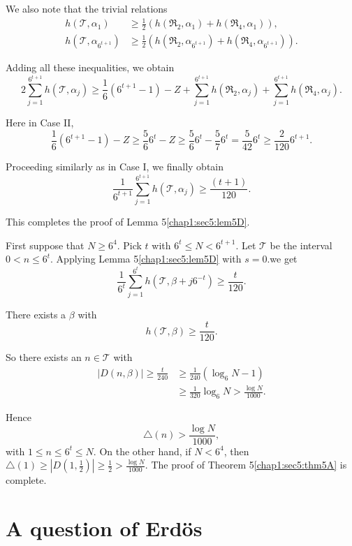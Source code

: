 We also note that the trivial relations
\begin{align*}
h(\mathscr{T}, \alpha_{1}) & \geq \frac{1}{2} (h(\mathfrak{R}_{2}, \alpha_{1}) + h(\mathfrak{R}_{4}, \alpha_{1})),\\
h(\mathscr{T}, \alpha_{6^{t+1}}) & \geq \frac{1}{2} (h(\mathfrak{R}_{2}, \alpha_{6^{t+1}}) + h(\mathfrak{R}_{4}, \alpha_{6^{t+1}})).
\end{align*}

Adding all these inequalities, we obtain
$$
2 \sum_{j=1}^{6^{t+1}} h(\mathscr{T}, \alpha_{j})\geq \frac{1}{6} (6^{t+1} - 1) - Z + \sum_{j=1}^{6^{t+1}} h(\mathfrak{R}_{2}, \alpha_{j}) + \sum_{j=1}^{6^{t+1}} h(\mathfrak{R}_{4}, \alpha_{j}).
$$

Here in Case II, 
$$
\frac{1}{6} (6^{t+1} - 1) - Z \geq \frac{5}{6} 6^{t} - Z \geq \frac{5}{6} 6^{t} - \frac{5}{7} 6^{t} = \frac{5}{42} 6^{t} \geq \frac{2}{120} 6^{t+1}.
$$

Proceeding similarly as in Case I, we finally obtain 
$$
\frac{1}{6^{t+1}} \sum_{j=1}^{6^{t+1}} h(\mathscr{T}, \alpha_{j}) \geq \frac{(t+1)}{120}.
$$

This completes the proof of Lemma 5\ref{chap1:sec5:lem5D}.

 First suppose that $N \geq 6^{4}$. Pick $t$ with $6^{t} \leq N  < 6^{t+1}$. Let $\mathscr{T}$ be the interval $0 < n \leq 6^{t}$. Applying Lemma 5\ref{chap1:sec5:lem5D} with $s = 0$.\pageoriginale we get
$$
\frac{1}{6^{t}} \sum_{j=1}^{6^{t}} h(\mathscr{T}, \beta + j 6^{-t}) \geq \frac{t}{120}.
$$

There exists a $\beta$ with
$$
h(\mathscr{T}, \beta) \geq \frac{t}{120}.
$$

So there exists an $n \in \mathscr{T}$ with
\begin{align*}
|D(n, \beta)| \geq \frac{t}{240} & \geq \frac{1}{240} (\log_{6} N - 1)\\
& \geq \frac{1}{320} \log_{6} N > \frac{\log N}{1000}.
\end{align*}

Hence
$$
\triangle(n) > \frac{\log N}{1000},
$$
with $1 \leq n \leq 6^{t} \leq N$. On the other hand, if $N < 6^{4}$, then $\triangle(1) \geq |D(1, \frac{1}{2})| \geq \frac{1}{2} > \frac{\log N}{1000}$. The proof of Theorem 5\ref{chap1:sec5:thm5A} is complete.

\section{A question of Erd\"{o}s}\label{chap1:sec6}

